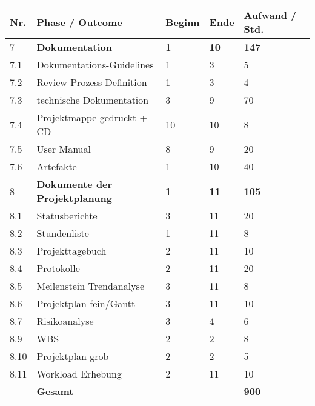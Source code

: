 \begin{tabular}{ | l | p{8cm} | p{2cm}|p{2cm}|p{2cm}|}
\hline
\textbf{Nr.} & \textbf{Phase / Outcome} & \textbf{Beginn}& \textbf{Ende}& \textbf{Aufwand / Std.} \\
\hline
7 &\textbf{Dokumentation}                   &\textbf{1} &\textbf{10} &\textbf{147}  \\
\hline
7.1 &Dokumentations-Guidelines         &1 &3 & 5 \\
\hline
7.2 &Review-Prozess Definition         &1 &3 & 4 \\
\hline
7.3 &technische Dokumentation          &3 &9 & 70 \\
\hline
7.4 &Projektmappe gedruckt + CD        &10 &10 & 8 \\
\hline
7.5 &User Manual                       &8 &9 & 20 \\
\hline
7.6 &Artefakte                         &1 &10 & 40 \\
8 &\textbf{Dokumente der Projektplanung}     &\textbf{1} &\textbf{11} &\textbf{105}  \\
\hline
8.1 & Statusberichte                &3 &11 & 20 \\
\hline
8.2 &Stundenliste                      &1 &11 & 8 \\
\hline
8.3 &Projekttagebuch                   &2 &11 & 10 \\
\hline
8.4 &Protokolle                        &2 &11 & 20 \\
\hline
8.5 &Meilenstein Trendanalyse          &3 &11 & 8 \\
\hline
8.6 &Projektplan fein/Gantt            &3 &11 & 10 \\
\hline
8.7 &Risikoanalyse                     &3 &4 & 6 \\
\hline
8.9 &WBS                               &2 &2 & 8 \\
\hline
8.10 &Projektplan grob                 &2 &2 & 5 \\
\hline
8.11 &Workload Erhebung                &2 &11 & 10 \\
\hline
\hline
& \textbf{Gesamt} & & & \textbf{900} \\
\hline
\hline
\end{tabular}
